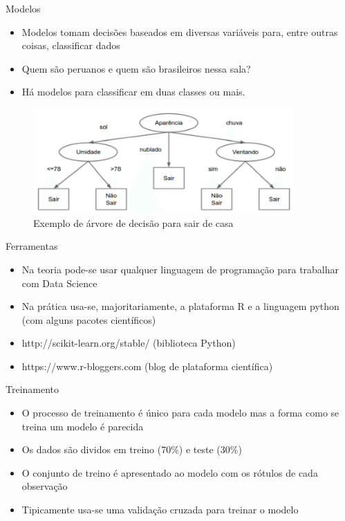 \begin{frame}	
	\begin{block}{Modelos}	
		\begin{itemize}
			\item Modelos tomam decisões baseados em diversas variáveis para, entre outras coisas, classificar dados
			\item Quem são peruanos e quem são brasileiros nessa sala?
			\item Há modelos para classificar em duas classes ou mais.
		\end{itemize}			
		\begin{figure}[!htb]
			\centering	  				
			\includegraphics[height=4cm, width = 10cm]{./pic/arvore.png}
			\caption{Exemplo de árvore de decisão para sair de casa}
			\label{fig_Arvore}
		\end{figure}	
	\end{block}
\end{frame}


\begin{frame}	
	\begin{block}{Ferramentas}	
		\begin{itemize}
			\item Na teoria pode-se usar qualquer linguagem de programação para trabalhar com Data Science
			\item Na prática usa-se, majoritariamente, a plataforma R e a linguagem python (com alguns pacotes científicos)
			\item http://scikit-learn.org/stable/  (biblioteca Python)
			\item https://www.r-bloggers.com (blog de plataforma científica)
		\end{itemize}		
	\end{block}
\end{frame}

\begin{frame}	
	\begin{block}{Treinamento}	
		\begin{itemize}
			\item O processo de treinamento é único para cada modelo mas a forma como se treina um modelo é parecida
			\item Os dados são dividos em treino (70\%) e teste (30\%)
			\item O conjunto de treino é apresentado ao modelo com os rótulos de cada observação
			\item Tipicamente usa-se uma validação cruzada para treinar o modelo
		\end{itemize}		
	\end{block}
\end{frame}

